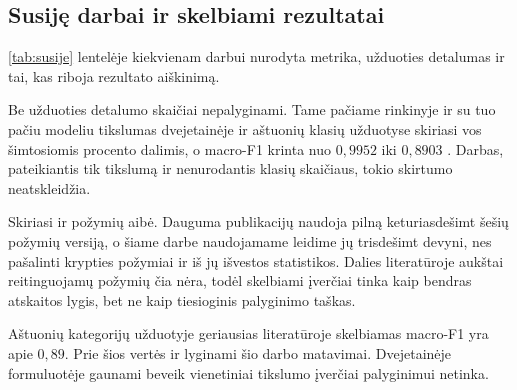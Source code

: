 \subsection{Susiję darbai ir skelbiami rezultatai}

\ref{tab:susije} lentelėje kiekvienam darbui nurodyta metrika, užduoties
detalumas ir tai, kas riboja rezultato aiškinimą.

Be užduoties detalumo skaičiai nepalyginami. Tame pačiame rinkinyje ir
su tuo pačiu modeliu tikslumas dvejetainėje ir aštuonių klasių
užduotyse skiriasi vos šimtosiomis procento dalimis, o macro-F1 krinta
nuo $0{,}9952$ iki $0{,}8903$ \cite{almahaqeri2026gradient}. Darbas,
pateikiantis tik tikslumą ir nenurodantis klasių skaičiaus, tokio
skirtumo neatskleidžia.

Skiriasi ir požymių aibė. Dauguma publikacijų naudoja pilną
keturiasdešimt šešių požymių versiją, o šiame darbe naudojamame leidime
jų trisdešimt devyni, nes pašalinti krypties požymiai ir iš jų išvestos
statistikos. Dalies literatūroje aukštai reitinguojamų požymių čia nėra,
todėl skelbiami įverčiai tinka kaip bendras atskaitos lygis, bet ne kaip
tiesioginis palyginimo taškas.

Aštuonių kategorijų užduotyje geriausias literatūroje skelbiamas
macro-F1 yra apie $0{,}89$. Prie šios vertės ir lyginami šio darbo
matavimai. Dvejetainėje formuluotėje gaunami beveik vienetiniai tikslumo
įverčiai palyginimui netinka.

%

